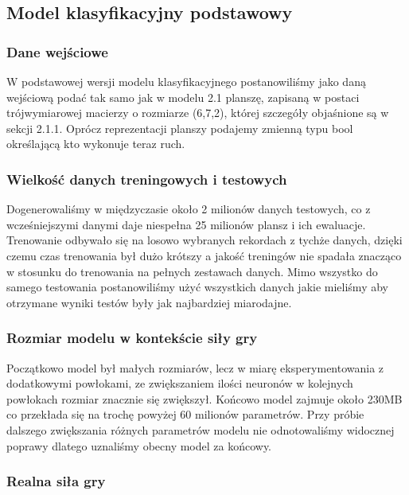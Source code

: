 \documentclass[12pt]{article}
\begin{document}
\subsection{Model klasyfikacyjny podstawowy}

\subsubsection{Dane wejściowe}

W podstawowej wersji modelu klasyfikacyjnego postanowiliśmy jako daną wejściową podać tak samo jak w modelu 2.1 planszę, zapisaną w postaci trójwymiarowej macierzy o rozmiarze (6,7,2), której szczegóły objaśnione są w sekcji 2.1.1. Oprócz reprezentacji planszy podajemy zmienną typu bool określającą kto wykonuje teraz ruch.

\subsubsection{Wielkość danych treningowych i testowych}

Dogenerowaliśmy w międzyczasie około 2 milionów danych testowych, co z wcześniejszymi danymi daje niespełna 25 milionów plansz i ich ewaluacje. Trenowanie odbywało się na losowo wybranych rekordach z tychże danych, dzięki czemu czas trenowania był dużo krótszy a jakość treningów nie spadała znacząco w stosunku do trenowania na pełnych zestawach danych. Mimo wszystko do samego testowania postanowiliśmy użyć wszystkich danych jakie mieliśmy aby otrzymane wyniki testów były jak najbardziej miarodajne.

\subsubsection{Rozmiar modelu w kontekście siły gry}

Początkowo model był małych rozmiarów, lecz w miarę eksperymentowania z dodatkowymi powłokami, ze zwiększaniem ilości neuronów w kolejnych powłokach rozmiar znacznie się zwiększył. Końcowo model zajmuje około 230MB co przekłada się na trochę powyżej 60 milionów parametrów. Przy próbie dalszego zwiększania różnych parametrów modelu nie odnotowaliśmy widocznej poprawy dlatego uznaliśmy obecny model za końcowy.

\subsubsection{Realna siła gry}
\end{document}
